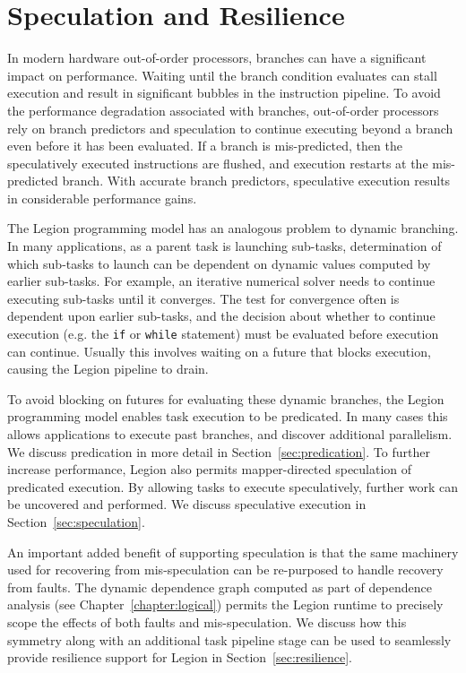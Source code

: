 

\chapter{Speculation and Resilience}
\label{chapter:resilience}
In modern hardware out-of-order processors, branches
can have a significant impact on performance. Waiting
until the branch condition evaluates can stall 
execution and result in significant bubbles in
the instruction pipeline. To
avoid the performance degradation associated with 
branches, out-of-order processors rely on branch
predictors and speculation to continue executing
beyond a branch even before it has been evaluated.
If a branch is mis-predicted, then the speculatively
executed instructions are flushed, and execution
restarts at the mis-predicted branch. With accurate
branch predictors, speculative execution results
in considerable performance gains.

The Legion programming model has an analogous problem
to dynamic branching. In many applications, as a 
parent task is launching sub-tasks, determination
of which sub-tasks to launch can be dependent on dynamic
values computed by earlier sub-tasks. For example, an 
iterative numerical solver needs to continue executing
sub-tasks until it converges. The test for convergence
often is dependent upon earlier sub-tasks, and the
decision about whether to continue execution (e.g. the
{\tt if} or {\tt while} statement) must be evaluated
before execution can continue. Usually this involves
waiting on a future that blocks execution, causing
the Legion pipeline to drain.

To avoid blocking on futures for evaluating these
dynamic branches, the Legion programming model enables
task execution to be predicated. In many cases this
allows applications to execute past branches, and
discover additional parallelism. We discuss predication
in more detail in Section~\ref{sec:predication}.
To further increase performance, Legion also permits
mapper-directed speculation of predicated execution.
By allowing tasks to execute speculatively, further
work can be uncovered and performed. We discuss
speculative execution in Section~\ref{sec:speculation}.

An important added benefit of supporting speculation
is that the same machinery used for recovering from
mis-speculation can be re-purposed to handle recovery
from faults. The dynamic dependence graph computed as
part of dependence analysis 
(see Chapter~\ref{chapter:logical}) permits the Legion
runtime to precisely scope the effects of both faults
and mis-speculation. We discuss how this symmetry along
with an additional task pipeline stage can be used
to seamlessly provide resilience support for Legion
in Section~\ref{sec:resilience}.

